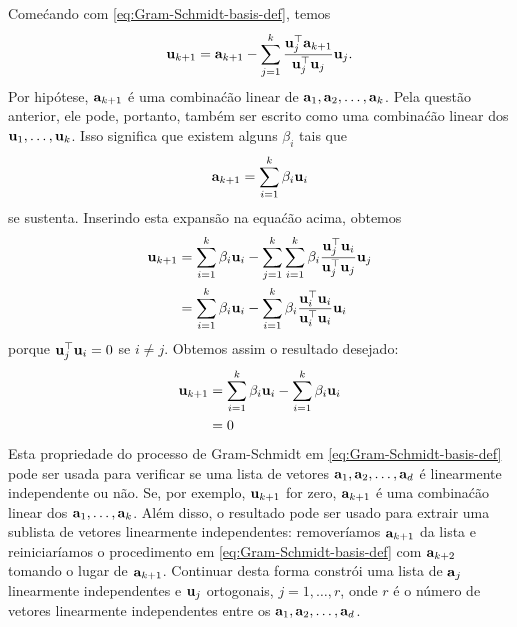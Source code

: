 \begin{exenumerate}
    \begin{solution}
        Come\'cando com \eqref{eq:Gram-Schmidt-basis-def}, temos
        \begin{equation}
            \mathbf{u}_{k+1} = \mathbf{a}_{k+1} - \sum_{j=1}^{k} \frac{\mathbf{u}_j^\top \mathbf{a}_{k+1}}{\mathbf{u}_j^\top\mathbf{u}_j} \mathbf{u}_j.
        \end{equation}
        Por hip\'otese, $\mathbf{a}_{k+1}$ \'e uma combina\'c\~ao linear de $\mathbf{a}_1, \mathbf{a}_2, \ldots,
        \mathbf{a}_k$. Pela quest\~ao anterior, ele pode, portanto, tamb\'em ser escrito como uma combina\'c\~ao
        linear dos $\mathbf{u}_1, \ldots, \mathbf{u}_k$. Isso significa que existem alguns
        $\beta_i$ tais que
        \begin{equation}
            \mathbf{a}_{k+1} = \sum_{i=1}^k \beta_i \mathbf{u}_i
        \end{equation}
        se sustenta. Inserindo esta expans\~ao na equa\'c\~ao acima, obtemos
        \begin{align}
            \mathbf{u}_{k+1}  &=  \sum_{i=1}^k \beta_i \mathbf{u}_i - \sum_{j=1}^k \sum_{i=1}^k \beta_i \frac{\mathbf{u}_j^\top\mathbf{u}_i}{\mathbf{u}_j^\top\mathbf{u}_j} \mathbf{u}_j\\
            &= \sum_{i=1}^k \beta_i \mathbf{u}_i - \sum_{i=1}^k \beta_i  \frac{\mathbf{u}_i^\top\mathbf{u}_i}{\mathbf{u}_i^\top\mathbf{u}_i} \mathbf{u}_i
        \end{align}
        porque $\mathbf{u}_j^\top \mathbf{u}_i = 0$ se $i \neq j$. Obtemos assim o resultado desejado:
        \begin{align}
            \mathbf{u}_{k+1} & =  \sum_{i=1}^k \beta_i \mathbf{u}_i - \sum_{i=1}^k \beta_i \mathbf{u}_i\\
            &= 0
        \end{align}
        Esta propriedade do processo de Gram-Schmidt em
        \eqref{eq:Gram-Schmidt-basis-def} pode ser usada para verificar se uma lista de
        vetores $\mathbf{a}_1, \mathbf{a}_2, \ldots, \mathbf{a}_d$ \'e linearmente independente ou n\~ao. Se, por
        exemplo, $\mathbf{u}_{k+1}$ for zero, $\mathbf{a}_{k+1}$ \'e uma combina\'c\~ao linear dos $\mathbf{a}_1,
        \ldots, \mathbf{a}_k$. Al\'em disso, o resultado pode ser usado para extrair uma sublista de vetores linearmente
        independentes: remover\'iamos $\mathbf{a}_{k+1}$ da lista e reiniciar\'iamos
        o procedimento em \eqref{eq:Gram-Schmidt-basis-def} com $\mathbf{a}_{k+2}$ tomando
        o lugar de $\mathbf{a}_{k+1}$. Continuar desta forma constr\'oi uma lista de
        $\mathbf{a}_j$ linearmente independentes e $\mathbf{u}_j$ ortogonais, $j=1, \ldots, r$, onde
        $r$ \'e o n\'umero de vetores linearmente independentes entre os $\mathbf{a}_1, \mathbf{a}_2,
        \ldots, \mathbf{a}_d$.
        
    \end{solution}
\end{exenumerate}


